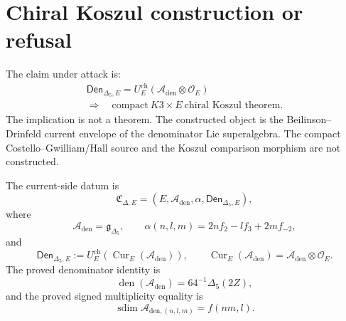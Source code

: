 \section{Chiral Koszul construction or refusal}
\label{sec:chiral-koszul-construction-or-refusal}

\providecommand{\Z}{\mathbb Z}
\providecommand{\C}{\mathbb C}
\providecommand{\Ran}{\operatorname{Ran}}
\providecommand{\Cur}{\operatorname{Cur}}
\providecommand{\Prim}{\operatorname{Prim}}
\providecommand{\Obs}{\operatorname{Obs}}
\providecommand{\BKM}{\mathrm{BKM}}
\providecommand{\Hall}{\mathrm{Hall}}
\providecommand{\hCS}{\mathrm{hCS}}
\providecommand{\barB}{\bar B}
\providecommand{\Omegach}{\Omega^{\mathrm{ch}}}
\providecommand{\SCchtop}{\mathsf{SC}^{\mathrm{ch,top}}}
\providecommand{\Den}{\mathsf{Den}}
\providecommand{\sdim}{\operatorname{sdim}}
\providecommand{\smult}{\operatorname{smult}}

The claim under attack is:
$$
\begin{gathered}
\Den_{\Delta_5,E}
=U_E^{\mathrm{ch}}\!
\left(\mathcal A_{\mathrm{den}}\otimes\mathcal O_E\right)\\
\Longrightarrow\quad
\text{compact}\ K3\times E\ \text{chiral Koszul theorem.}
\end{gathered}
$$
The implication is not a theorem.  The constructed object is the
Beilinson--Drinfeld current envelope of the denominator Lie
superalgebra.  The compact Costello--Gwilliam/Hall source and the
Koszul comparison morphism are not constructed.

\begin{definition}
\label{def:cellten-current-side-datum}
The current-side datum is
$$
\mathfrak C_{\Delta,E}
=\left(E,\mathcal A_{\mathrm{den}},\alpha,\Den_{\Delta_5,E}\right),
$$
where
$$
\mathcal A_{\mathrm{den}}=\mathfrak g_{\Delta_5},\qquad
\alpha(n,l,m)=2nf_2-lf_3+2mf_{-2},
$$
and
$$
\Den_{\Delta_5,E}
:=U_E^{\mathrm{ch}}
\left(\Cur_E(\mathcal A_{\mathrm{den}})\right),
\qquad
\Cur_E(\mathcal A_{\mathrm{den}})
=\mathcal A_{\mathrm{den}}\otimes\mathcal O_E.
$$
The proved denominator identity is
$$
\operatorname{den}(\mathcal A_{\mathrm{den}})
=64^{-1}\Delta_5(2Z),
$$
and the proved signed multiplicity equality is
$$
\sdim \mathcal A_{\mathrm{den},(n,l,m)}=f(nm,l).
$$
\end{definition}

